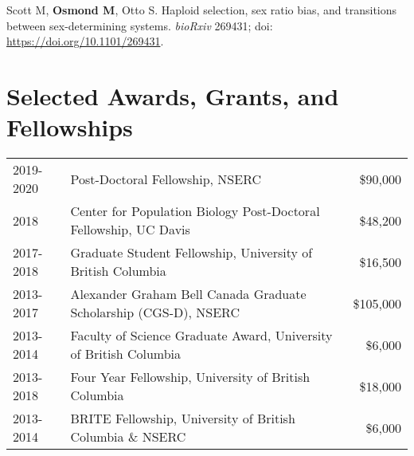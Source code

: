 \documentclass[12pt]{article}
\begin{document}
\noindent\hspace{.1cm}Scott M, \textbf{Osmond M}, Otto S. Haploid selection, sex ratio bias, and transitions between sex-determining systems. \textit{bioRxiv} 269431; doi: \href{https://www.biorxiv.org/content/early/2018/02/22/269431}{https://doi.org/10.1101/269431}.


\section*{Selected Awards, Grants, and Fellowships}

\begin{tabular}{llr}
  2019-2020 & Post-Doctoral Fellowship, NSERC & \$90,000 \\
  2018 & Center for Population Biology Post-Doctoral Fellowship, UC Davis & \$48,200 \\
  2017-2018 & Graduate Student Fellowship, University of British Columbia & \$16,500 \\
  2013-2017 & Alexander Graham Bell Canada Graduate Scholarship (CGS-D), NSERC & \$105,000\\
  2013-2014 & Faculty of Science Graduate Award, University of British Columbia & \$6,000\\
  2013-2018 & Four Year Fellowship, University of British Columbia & \$18,000\\
  2013-2014 & BRITE Fellowship, University of British Columbia \& NSERC & \$6,000\\

\end{tabular}
\end{document}
